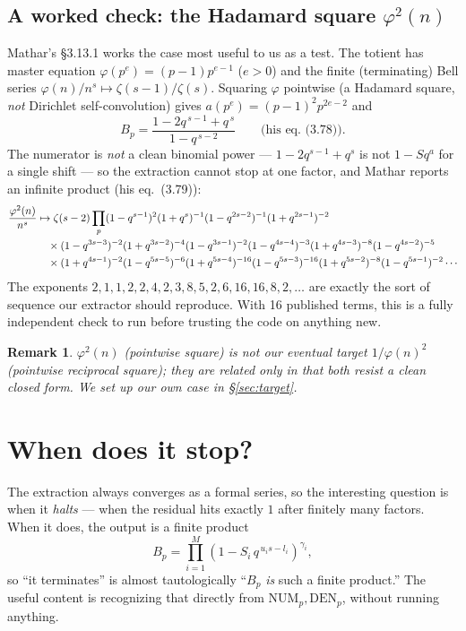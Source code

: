 \documentclass[11pt]{article}
\newtheorem{remark}[theorem]{Remark}
\begin{document}
\subsection{A worked check: the Hadamard square $\varphi^2(n)$}

Mathar's \S3.13.1 works the case most useful to us as a test. The totient has master
equation $\varphi(p^e)=(p-1)p^{e-1}$ ($e>0$) and the finite (terminating) Bell
series $\varphi(n)/n^s\mapsto\zeta(s-1)/\zeta(s)$. Squaring $\varphi$ pointwise (a
Hadamard square, \emph{not} Dirichlet self-convolution) gives $a(p^e)=(p-1)^2p^{2e-2}$
and
\[
B_p=\frac{1-2q^{\,s-1}+q^{\,s}}{1-q^{\,s-2}}\qquad\text{(his eq.~(3.78))}.
\]
The numerator is \emph{not} a clean binomial power --- $1-2q^{s-1}+q^{s}$ is not
$1-S q^{a}$ for a single shift --- so the extraction cannot stop at one factor, and
Mathar reports an infinite product (his eq.~(3.79)):
\begin{align}
\frac{\varphi^2(n)}{n^s} &\mapsto \zeta(s-2)\prod_p
(1-q^{s-1})^2(1+q^{s})^{-1}(1-q^{2s-2})^{-1}(1+q^{2s-1})^{-2}\notag\\
&\quad\times(1-q^{3s-3})^{-2}(1+q^{3s-2})^{-4}(1-q^{3s-1})^{-2}
(1-q^{4s-4})^{-3}(1+q^{4s-3})^{-8}(1-q^{4s-2})^{-5}\notag\\
&\quad\times(1+q^{4s-1})^{-2}(1-q^{5s-5})^{-6}(1+q^{5s-4})^{-16}(1-q^{5s-3})^{-16}
(1+q^{5s-2})^{-8}(1-q^{5s-1})^{-2}\cdots \label{eq:mathar-phi2}
\end{align}
The exponents $2,1,1,2,2,4,2,3,8,5,2,6,16,16,8,2,\dots$ are exactly the sort of
sequence our extractor should reproduce. With 16 published terms, this is a fully
independent check to run before trusting the code on anything new.

\begin{remark}
$\varphi^2(n)$ (pointwise square) is \emph{not} our eventual target
$1/\varphi(n)^2$ (pointwise reciprocal square); they are related only in that both
resist a clean closed form. We set up our own case in \S\ref{sec:target}.
\end{remark}

\section{When does it stop?}
\label{sec:termination}

The extraction always converges as a formal series, so the interesting question is
when it \emph{halts} --- when the residual hits exactly $1$ after finitely many
factors. When it does, the output is a finite product
\[
B_p = \prod_{i=1}^{M} (1 - S_i\, q^{\,u_i s - l_i})^{\gamma_i},
\]
so ``it terminates'' is almost tautologically ``$B_p$ \emph{is} such a finite
product.'' The useful content is recognizing that directly from
$\mathrm{NUM}_p,\mathrm{DEN}_p$, without running anything.
\end{document}

